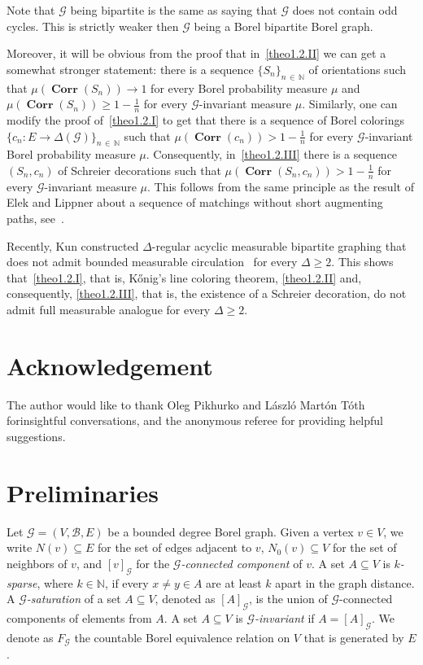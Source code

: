 \documentclass[AHL,Unicode,longabstracts,published]{cedram}
\DeclareMathOperator{\Corr}{\mathbf{Corr}}
\newcommand{\clG}{\mathcal{G}}
\newcommand{\clB}{\mathcal{B}}
\newcommand{\bbZ}{\mathbb{N}}
\newcommand{\clG}{\mathcal{G}}
\begin{document}
Note that $\clG$ being bipartite is the same as saying that $\clG$ does not contain odd cycles. This is strictly weaker then $\clG$ being a Borel bipartite Borel graph.

Moreover, it will be obvious from the proof that in~\eqref{theo1.2.II} we can get a somewhat stronger statement: there is a sequence $\{S_n\}_{n\,\in\,\bbZ}$ of orientations such that $\mu(\Corr(S_n))\to 1$ for every Borel probability measure $\mu$ and $\mu(\Corr(S_n))\ge 1-\tfrac{1}{n}$ for every $\clG$-invariant measure $\mu$. Similarly, one can modify the proof of~\eqref{theo1.2.I} to get that there is a sequence of Borel colorings $\{c_n:E\to \Delta(\clG)\}_{n\,\in\,\bbZ}$ such that $\mu(\Corr(c_n))> 1-\tfrac{1}{n}$ for every $\clG$-invariant Borel probability measure $\mu$. Consequently, in~\eqref{theo1.2.III} there is a sequence $(S_n,c_n)$ of Schreier decorations such that $\mu(\Corr(S_n,c_n))>1-\tfrac{1}{n}$ for every $\clG$-invariant measure $\mu$. This follows from the same principle as the result of Elek and Lippner about a sequence of matchings without short augmenting paths, see~\cite{ElekLippner}.

\begin{rema}
Recently, Kun constructed $\Delta$-regular acyclic measurable bipartite graphing that does not admit bounded measurable circulation~\cite[Theorem~1]{Kun} for every $\Delta\ge 2$. This shows that~\eqref{theo1.2.I}, that is, Kőnig's line coloring theorem, \eqref{theo1.2.II} and, consequently, \eqref{theo1.2.III}, that is, the existence of a Schreier decoration, do not admit full measurable analogue for every $\Delta\ge 2$.
\end{rema}



\section*{Acknowledgement}
The author would like to thank Oleg Pikhurko and László Martón Tóth for\linebreak insightful conversations, and the anonymous referee for providing helpful suggestions.



\section{Preliminaries}

Let $\clG=(V,\clB,E)$ be a bounded degree Borel graph. Given a vertex $v\in V$, we write $N(v)\subseteq E$ for the set of edges adjacent to $v$, $N_0(v)\subseteq V$ for the set of neighbors of $v$, and $[v]_\clG$ for the \emph{$\clG$-connected component} of $v$. A set $A\subseteq V$ is \emph{$k$-sparse}, where $k\in \bbZ$, if every $x\not=y\in A$ are at least $k$ apart in the graph distance. A \emph{$\clG$-saturation} of a set $A\subseteq V$, denoted as $[A]_\clG$, is the union of $\clG$-connected components of elements from $A$. A set $A\subseteq V$ is \emph{$\clG$-invariant} if $A=[A]_{\clG}$. We denote as $F_\clG$ the countable Borel equivalence relation on $V$ that is generated by $E$.
\end{document}
